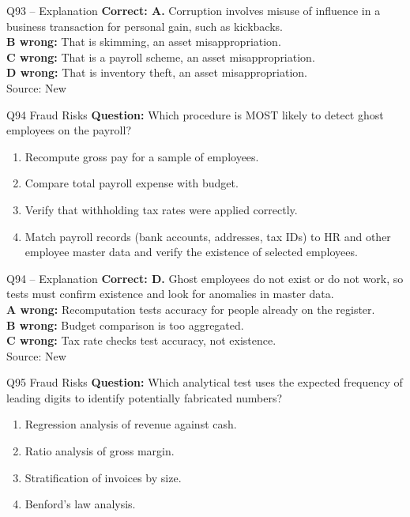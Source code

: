 \documentclass[aspectratio=169,10pt]{beamer}
\begin{document}
\begin{frame}[t]{Q93 -- Explanation}
	\footnotesize
	\textbf{Correct: A.} Corruption involves misuse of influence in a business transaction for personal gain, such as kickbacks. \\[5pt]
\textbf{B wrong:} That is skimming, an asset misappropriation. \\[3pt]
\textbf{C wrong:} That is a payroll scheme, an asset misappropriation. \\[3pt]
\textbf{D wrong:} That is inventory theft, an asset misappropriation. \\[3pt]
	\vfill {\tiny Source: New}
\end{frame}

\begin{frame}[t]{Q94 \hfill {\scriptsize Fraud Risks}}
	\small
	\textbf{Question:} Which procedure is MOST likely to detect ghost employees on the payroll?
	\begin{enumerate}[label=\Alph*.,itemsep=1pt,topsep=3pt]
			\item Recompute gross pay for a sample of employees.
			\item Compare total payroll expense with budget.
			\item Verify that withholding tax rates were applied correctly.
			\item Match payroll records (bank accounts, addresses, tax IDs) to HR and other employee master data and verify the existence of selected employees.
	\end{enumerate}
\end{frame}

\begin{frame}[t]{Q94 -- Explanation}
	\footnotesize
	\textbf{Correct: D.} Ghost employees do not exist or do not work, so tests must confirm existence and look for anomalies in master data. \\[5pt]
\textbf{A wrong:} Recomputation tests accuracy for people already on the register. \\[3pt]
\textbf{B wrong:} Budget comparison is too aggregated. \\[3pt]
\textbf{C wrong:} Tax rate checks test accuracy, not existence. \\[3pt]
	\vfill {\tiny Source: New}
\end{frame}

\begin{frame}[t]{Q95 \hfill {\scriptsize Fraud Risks}}
	\small
	\textbf{Question:} Which analytical test uses the expected frequency of leading digits to identify potentially fabricated numbers?
	\begin{enumerate}[label=\Alph*.,itemsep=1pt,topsep=3pt]
			\item Regression analysis of revenue against cash.
			\item Ratio analysis of gross margin.
			\item Stratification of invoices by size.
			\item Benford's law analysis.
	\end{enumerate}
\end{frame}
\end{document}
